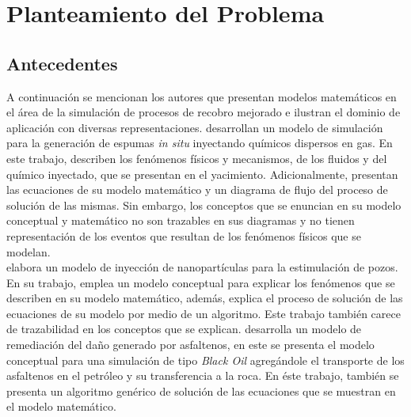 

\chapter{Planteamiento del Problema}
%
\section{Antecedentes}

A continuación se mencionan los autores que presentan modelos matemáticos en el área de la simulación de procesos de recobro mejorado e ilustran el dominio de aplicación con diversas representaciones. \cite{ValenciaJD2016, valencia2018development} desarrollan un modelo de simulación para la generación de espumas \textit{in situ} inyectando químicos dispersos en gas. En este trabajo, describen los fenómenos físicos y mecanismos, de los fluidos y del químico inyectado, que se presentan en el yacimiento. Adicionalmente, presentan las ecuaciones de su modelo matemático y un diagrama de flujo del proceso de solución de las mismas. Sin embargo, los conceptos que se enuncian en su modelo conceptual y matemático no son trazables en sus diagramas y no tienen representación de los eventos que resultan de los fenómenos físicos que se modelan.\\

\cite{MozoID2017} elabora un modelo de inyección de nanopartículas para la estimulación de pozos. En su trabajo, emplea un modelo conceptual para explicar los fenómenos que se describen en su modelo matemático, además, explica el proceso de solución de las ecuaciones de su modelo por medio de un algoritmo. Este trabajo también carece de trazabilidad en los conceptos que se explican. \cite{IsazaCN2017} desarrolla un modelo de remediación del daño generado por asfaltenos, en este se presenta el modelo conceptual para una simulación de tipo \textit{Black Oil} agregándole el transporte de los asfaltenos en el petróleo y su transferencia a la roca. En éste trabajo, también se presenta un algoritmo genérico de solución de las ecuaciones que se muestran en el modelo matemático.\\

